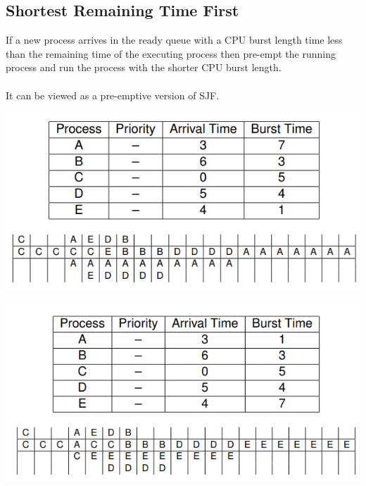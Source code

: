 \documentclass{article}[18pt]
\begin{document}
\subsection{Shortest Remaining Time First}
If a new process arrives in the ready queue with a CPU burst length time less than the remaining time of the executing process then pre-empt the running process and run the process with the shorter CPU burst length.\\
\\
It can be viewed as a pre-emptive version of SJF.
\begin{center}
\includegraphics[scale=0.7]{SRTF1}
\end{center}
\begin{center}
\includegraphics[scale=0.7]{SRTF2}
\end{center}
\end{document}
